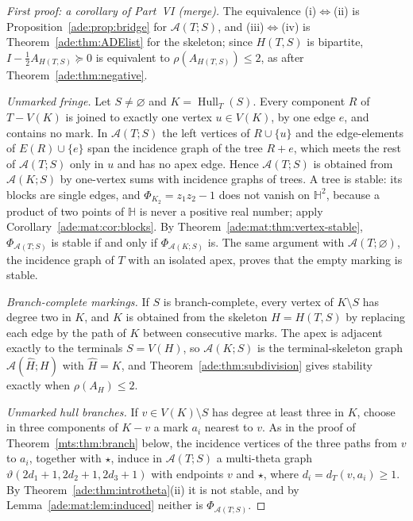 \documentclass[11pt]{article}
\numberwithin{equation}{section}
\theoremstyle{definition}
\newcommand{\HH}{\mathbb H}
\newcommand{\calA}{\mathcal A}
\newcommand{\Hull}{\operatorname{Hull}}
\begin{document}
\begin{proof}[First proof: a corollary of Part~VI (merge)]
The equivalence (i)$\Leftrightarrow$(ii) is Proposition~\ref{ade:prop:bridge}
for $\calA(T;S)$, and (iii)$\Leftrightarrow$(iv) is
Theorem~\ref{ade:thm:ADElist} for the skeleton; since $H(T,S)$ is
bipartite, $I-\tfrac12A_{H(T,S)}\succeq0$ is equivalent to
$\rho(A_{H(T,S)})\le2$, as after Theorem~\ref{ade:thm:negative}.

\emph{Unmarked fringe.} Let $S\ne\varnothing$ and $K=\Hull_T(S)$. Every
component $R$ of $T-V(K)$ is joined to exactly one vertex $u\in V(K)$, by
one edge $e$, and contains no mark. In $\calA(T;S)$ the left vertices of
$R\cup\{u\}$ and the edge-elements of $E(R)\cup\{e\}$ span the incidence
graph of the tree $R+e$, which meets the rest of $\calA(T;S)$ only in $u$
and has no apex edge. Hence $\calA(T;S)$ is obtained from $\calA(K;S)$ by
one-vertex sums with incidence graphs of trees. A tree is stable: its
blocks are single edges, and $\Phi_{K_2}=z_1z_2-1$ does not vanish on
$\HH^2$, because a product of two points of $\HH$ is never a positive
real number; apply Corollary~\ref{ade:mat:cor:blocks}. By
Theorem~\ref{ade:mat:thm:vertex-stable}, $\Phi_{\calA(T;S)}$ is stable if
and only if $\Phi_{\calA(K;S)}$ is. The same argument with
$\calA(T;\varnothing)$, the incidence graph of $T$ with an isolated apex,
proves that the empty marking is stable.

\emph{Branch-complete markings.} If $S$ is branch-complete, every
vertex of $K\setminus S$ has degree two in $K$, and $K$ is obtained from
the skeleton $H=H(T,S)$ by replacing each edge by the path of $K$ between
consecutive marks. The apex is adjacent exactly to the terminals $S=V(H)$,
so $\calA(K;S)$ is the terminal-skeleton graph $\calA(\widehat H;H)$ with
$\widehat H=K$, and Theorem~\ref{ade:thm:subdivision} gives stability
exactly when $\rho(A_H)\le2$.

\emph{Unmarked hull branches.} If $v\in V(K)\setminus S$ has degree at
least three in $K$, choose in three components of $K-v$ a mark $a_i$
nearest to $v$. As in the proof of Theorem~\ref{mts:thm:branch} below,
the incidence vertices of the three paths from $v$ to $a_i$, together with
$\star$, induce in $\calA(T;S)$ a multi-theta graph
$\vartheta(2d_1+1,2d_2+1,2d_3+1)$ with endpoints $v$ and $\star$, where
$d_i=d_T(v,a_i)\ge1$. By Theorem~\ref{ade:thm:introtheta}(ii) it is not
stable, and by Lemma~\ref{ade:mat:lem:induced} neither is
$\Phi_{\calA(T;S)}$.
\end{proof}
\end{document}
